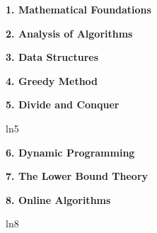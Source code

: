 \documentclass[8pt]{minimal}
\begin{document}
\begin{flushleft}
\begin{multicols}{3}


    \textbf{1. Mathematical Foundations}
    

    \textbf{2. Analysis of Algorithms}
    

    \textbf{3. Data Structures}

    
    \textbf{4. Greedy Method}
    


    \textbf{5. Divide and Conquer}

    ln5


    \textbf{6. Dynamic Programming}
    

    \textbf{7. The Lower Bound Theory}

    


    \textbf{8. Online Algorithms}

    ln8
    

\end{multicols}
\end{flushleft}
\end{document}
